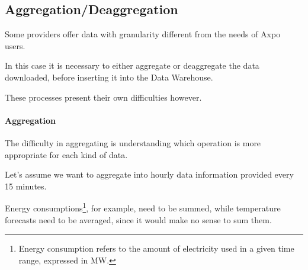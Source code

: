     

    
    

\subsection{Aggregation/Deaggregation} \label{etl:problems:aggregation_deaggregation}
    Some providers offer data with granularity different from the needs of Axpo users.
    
    In this case it is necessary to either aggregate or deaggregate the data downloaded, before inserting it into the Data Warehouse.
    
    These processes present their own difficulties however.
    
    \paragraph{Aggregation}
        The difficulty in aggregating is understanding which operation is more appropriate for each kind of data.
        
        Let's assume we want to aggregate into hourly data information provided every 15 minutes.
        
        Energy consumptions\footnote{
            Energy consumption refers to the amount of electricity used in a given time range, expressed in MW.
        }, for example, need to be summed, while temperature forecasts need to be averaged, since it would make no sense to sum them.
        
